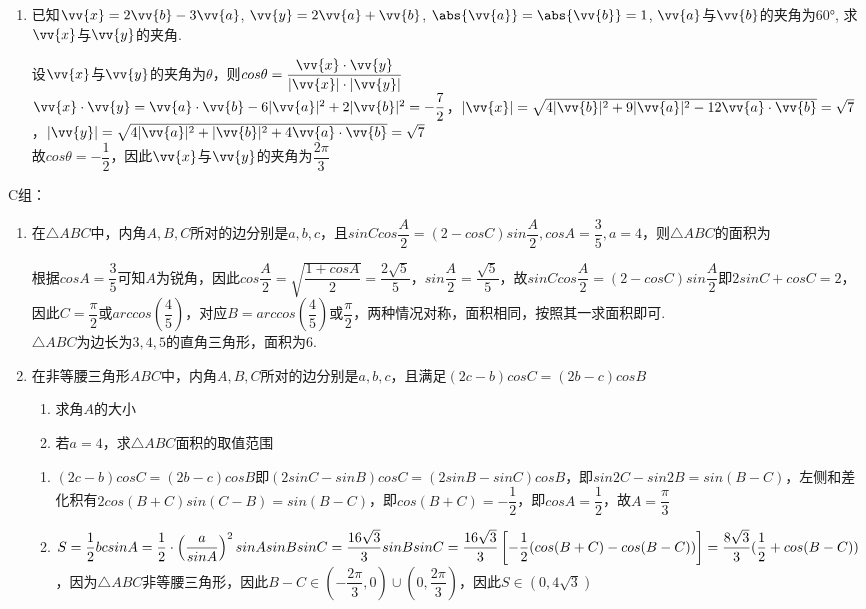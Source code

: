 \begin{enumerate}
    
    \item 已知$\vv{x}=2\vv{b}-3\vv{a}$, $\vv{y}=2\vv{a}+\vv{b}$, $\abs{\vv{a}}=\abs{\vv{b}}=1$, $\vv{a}$与$\vv{b}$的夹角为$\ang{60}$, 求$\vv{x}$与$\vv{y}$的夹角. 
    \begin{jieda}
        设$\vv{x}$与$\vv{y}$的夹角为$\theta$，则$cos\theta = \dfrac{\vv{x} \cdot \vv{y}}{|\vv{x}| \cdot |\vv{y}|}$ \\
        $\vv{x} \cdot \vv{y} = \vv{a}\cdot\vv{b} -6|\vv{a}|^2+2|\vv{b}|^2 = -\dfrac{7}{2}$，$|\vv{x}| = \sqrt{4|\vv{b}|^2 + 9|\vv{a}|^2 - 12\vv{a}\cdot\vv{b}} = \sqrt{7}$，$|\vv{y}| = \sqrt{4|\vv{a}|^2 + |\vv{b}|^2 + 4\vv{a}\cdot\vv{b}} = \sqrt{7}$\\
        故$cos\theta = -\dfrac{1}{2}$，因此$\vv{x}$与$\vv{y}$的夹角为$\dfrac{2\pi}{3}$
    \end{jieda}
\end{enumerate}
C组：
\begin{enumerate}
    \item 在$\triangle{ABC}$中，内角$A,B,C$所对的边分别是$a, b, c$，且$sinC cos\dfrac{A}{2} = (2-cosC)sin\dfrac{A}{2}, cosA = \dfrac{3}{5}, a = 4$，则$\triangle{ABC}$的面积为
    \begin{jieda}
        根据$cosA = \dfrac{3}{5}$可知$A$为锐角，因此$cos\dfrac{A}{2} = \sqrt{\dfrac{1+cosA}{2}} = \dfrac{2\sqrt{5}}{5}$，$sin\dfrac{A}{2} = \dfrac{\sqrt{5}}{5}$，故$sinC cos\dfrac{A}{2} = (2-cosC)sin\dfrac{A}{2}$即$2sinC+cosC = 2$，因此$C = \dfrac{\pi}{2}$或$arccos\left(\dfrac{4}{5}\right)$，对应$B = arccos\left(\dfrac{4}{5}\right)$或$\dfrac{\pi}{2}$，两种情况对称，面积相同，按照其一求面积即可. \\
        $\triangle{ABC}$为边长为$3,4,5$的直角三角形，面积为6.
    \end{jieda}
    \item 在非等腰三角形$ABC$中，内角$A,B,C$所对的边分别是$a, b, c$，且满足$(2c-b)cosC = (2b-c)cosB$
    \begin{enumerate}
        \item 求角$A$的大小
        \item 若$a = 4$，求$\triangle{ABC}$面积的取值范围
    \end{enumerate}
    \begin{jieda}
        \begin{enumerate}
            \item $(2c-b)cosC = (2b-c)cosB$即$(2sinC-sinB)cosC = (2sinB - sinC)cosB$，即$sin2C-sin2B = sin(B-C)$，左侧和差化积有$2cos(B+C)sin(C-B) = sin(B-C)$，即$cos(B+C) = -\dfrac{1}{2}$，即$cosA = \dfrac{1}{2}$，故$A = \dfrac{\pi}{3}$
            \item $S = \dfrac{1}{2}bcsinA = \dfrac{1}{2} \cdot \left(\dfrac{a}{sinA}\right)^2 sinAsinBsinC = \dfrac{16\sqrt{3}}{3}sinBsinC = \\
            \dfrac{16\sqrt{3}}{3}\left[-\dfrac{1}{2}(cos(B+C) - cos(B-C))\right] = \dfrac{8\sqrt{3}}{3}(\dfrac{1}{2} + cos(B-C))$，因为$\triangle{ABC}$非等腰三角形，因此$B-C \in \left(-\dfrac{2\pi}{3}, 0\right) \cup \left(0, \dfrac{2\pi}{3}\right)$，因此$S \in \left(0, 4\sqrt{3}\right)$
        \end{enumerate}
    \end{jieda}
\end{enumerate}

